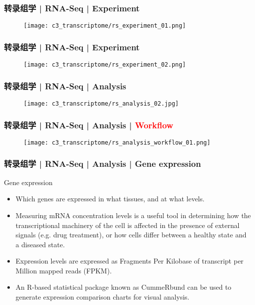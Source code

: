 \begin{frame}
  \frametitle{转录组学 | RNA-Seq | Experiment}
  \begin{figure}
    \centering
    \texttt{[image: c3\_transcriptome/rs\_experiment\_01.png]}
  \end{figure}
\end{frame}

\begin{frame}
  \frametitle{转录组学 | RNA-Seq | Experiment}
  \begin{figure}
    \centering
    \texttt{[image: c3\_transcriptome/rs\_experiment\_02.png]}
  \end{figure}
\end{frame}

\begin{frame}
  \frametitle{转录组学 | RNA-Seq | Analysis}
  \begin{figure}
    \centering
    \texttt{[image: c3\_transcriptome/rs\_analysis\_02.jpg]}
  \end{figure}
\end{frame}

\begin{frame}
  \frametitle{转录组学 | RNA-Seq | Analysis | \textcolor{red}{Workflow}}
  \begin{figure}
    \centering
    \texttt{[image: c3\_transcriptome/rs\_analysis\_workflow\_01.png]}
  \end{figure}
\end{frame}

\begin{frame}
  \frametitle{转录组学 | RNA-Seq | Analysis | Gene expression}
  \begin{block}{Gene expression}
    \begin{itemize}
      \item Which genes are expressed in what tissues, and at what levels.
      \item Measuring mRNA concentration levels is a useful tool in determining how the transcriptional machinery of the cell is affected in the presence of external signals (e.g. drug treatment), or how cells differ between a healthy state and a diseased state.
      \item Expression levels are expressed as Fragments Per Kilobase of transcript per Million mapped reads (FPKM).
      \item An R-based statistical package known as CummeRbund can be used to generate expression comparison charts for visual analysis.
    \end{itemize}
  \end{block}
\end{frame}

